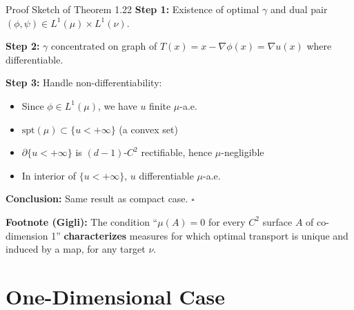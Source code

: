 \documentclass[aspectratio=169]{beamer}
\begin{document}
\begin{frame}{Proof Sketch of Theorem 1.22}
\textbf{Step 1:} Existence of optimal $\gamma$ and dual pair $(\phi, \psi) \in L^1(\mu) \times L^1(\nu)$.

\vspace{0.2cm}
\textbf{Step 2:} $\gamma$ concentrated on graph of $T(x) = x - \nabla\phi(x) = \nabla u(x)$ where differentiable.

\vspace{0.2cm}
\textbf{Step 3:} Handle non-differentiability:
\begin{itemize}
    \item Since $\phi \in L^1(\mu)$, we have $u$ finite $\mu$-a.e.
    \item $\text{spt}(\mu) \subset \{u < +\infty\}$ (a convex set)
    \item $\partial\{u < +\infty\}$ is $(d-1)$-$C^2$ rectifiable, hence $\mu$-negligible
    \item In interior of $\{u < +\infty\}$, $u$ differentiable $\mu$-a.e.
\end{itemize}

\vspace{0.2cm}
\textbf{Conclusion:} Same result as compact case. \hfill $\square$

\vspace{0.3cm}
\textbf{Footnote (Gigli):} The condition ``$\mu(A) = 0$ for every $C^2$ surface $A$ of co-dimension 1'' \textbf{characterizes} measures for which optimal transport is unique and induced by a map, for any target $\nu$.
\end{frame}

\section{One-Dimensional Case}
\end{document}
